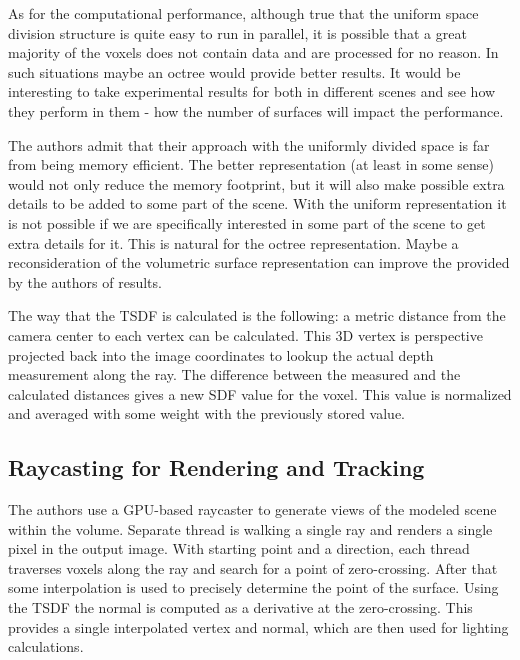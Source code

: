 \documentclass[11pt, a4paper]{article}
\theoremstyle{plain}
\begin{document}
    As for the computational performance, although true that the uniform space
    division structure is quite easy to run in parallel, it is possible that a
    great majority of the voxels does not contain data and are processed for no
    reason. In such situations maybe an octree would provide better results. It
    would be interesting to take experimental results for both in different
    scenes and see how they perform in them - how the number of surfaces will
    impact the performance.

    The authors admit that their approach with the uniformly divided space is
    far from being memory efficient. The better representation (at least in some
    sense) would not only reduce the memory footprint, but it will also make
    possible extra details to be added to some part of the scene. With the
    uniform representation it is not possible if we are specifically interested
    in some part of the scene to get extra details for it. This is natural for
    the octree representation. Maybe a reconsideration of the volumetric surface
    representation can improve the provided by the authors of
    \cite{kinectfusion} results.

    The way that the TSDF is calculated is the following: a metric distance from
    the camera center to each vertex can be calculated. This 3D vertex is
    perspective projected back into the image coordinates to lookup the actual
    depth measurement along the ray. The difference between the measured and the
    calculated distances gives a new SDF value for the voxel. This value is
    normalized and averaged with some weight with the previously stored value. 

  \subsection{Raycasting for Rendering and Tracking} %
  \label{sub:Raycasting for Rendering and Tracking}
    The authors use a GPU-based raycaster to generate views of the modeled scene
    within the volume. Separate thread is walking a single ray and renders a
    single pixel in the output image. With starting point and a direction, each
    thread traverses voxels along the ray and search for a point of
    zero-crossing. After that some interpolation is used to precisely determine
    the point of the surface. Using the TSDF the normal is computed as a
    derivative at the zero-crossing. This provides a single interpolated vertex
    and normal, which are then used for lighting calculations.
\end{document}
